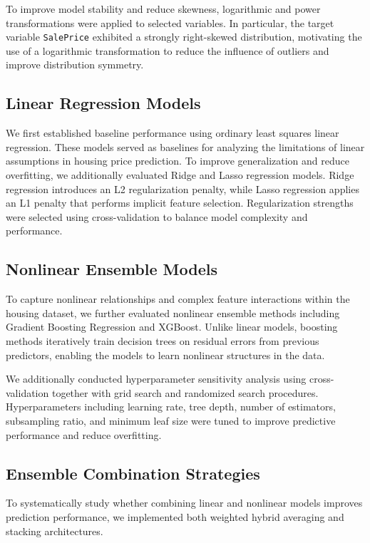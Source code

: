 \documentclass{article}
\begin{document}
To improve model stability and reduce skewness, logarithmic and power transformations were applied to selected variables. In particular, the target variable \texttt{SalePrice} exhibited a strongly right-skewed distribution, motivating the use of a logarithmic transformation to reduce the influence of outliers and improve distribution symmetry.

\subsection{Linear Regression Models}

We first established baseline performance using ordinary least squares linear regression. These models served as  baselines for analyzing the limitations of linear assumptions in housing price prediction.
To improve generalization and reduce overfitting, we additionally evaluated Ridge and Lasso regression models. Ridge regression introduces an L2 regularization penalty, while Lasso regression applies an L1 penalty that performs implicit feature selection. Regularization strengths were selected using cross-validation to balance model complexity and performance.

\subsection{Nonlinear Ensemble Models}

To capture nonlinear relationships and complex feature interactions within the housing dataset, we further evaluated nonlinear ensemble methods including Gradient Boosting Regression and XGBoost. Unlike linear models, boosting methods iteratively train decision trees on residual errors from previous predictors, enabling the models to learn nonlinear structures in the data.

 We additionally conducted hyperparameter sensitivity analysis using cross-validation together with grid search and randomized search procedures. Hyperparameters including learning rate, tree depth, number of estimators, subsampling ratio, and minimum leaf size were tuned to improve predictive performance and reduce overfitting.

\subsection{Ensemble Combination Strategies}

To systematically study whether combining linear and nonlinear models improves prediction performance, we implemented both weighted hybrid averaging and stacking architectures.
\end{document}

